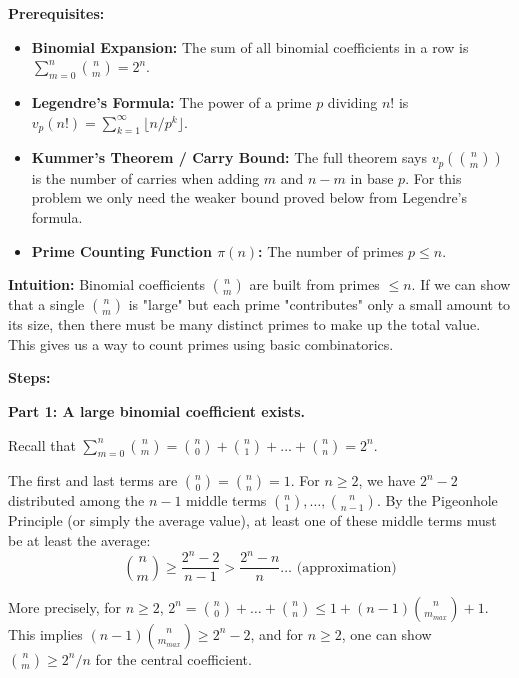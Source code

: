 \begin{solution}
\textbf{Prerequisites:}
\begin{itemize}
    \item \textbf{Binomial Expansion:} The sum of all binomial coefficients in a row is $\sum_{m=0}^n \binom{n}{m} = 2^n$.
    \item \textbf{Legendre's Formula:} The power of a prime $p$ dividing $n!$ is $v_p(n!) = \sum_{k=1}^\infty \lfloor n/p^k \rfloor$.
    \item \textbf{Kummer's Theorem / Carry Bound:} The full theorem says $v_p(\binom{n}{m})$ is the number of carries when adding $m$ and $n-m$ in base $p$. For this problem we only need the weaker bound proved below from Legendre's formula.
    \item \textbf{Prime Counting Function $\pi(n)$:} The number of primes $p \leq n$.
\end{itemize}

\bigskip

\textbf{Intuition:}
Binomial coefficients $\binom{n}{m}$ are built from primes $\leq n$. If we can show that a single $\binom{n}{m}$ is "large" but each prime "contributes" only a small amount to its size, then there must be many distinct primes to make up the total value. This gives us a way to count primes using basic combinatorics.

\bigskip

\textbf{Steps:}

\textbf{Part 1: A large binomial coefficient exists.}

Recall that $\sum_{m=0}^n \binom{n}{m} = \binom{n}{0} + \binom{n}{1} + \dots + \binom{n}{n} = 2^n$.

\bigskip

The first and last terms are $\binom{n}{0} = \binom{n}{n} = 1$. For $n \geq 2$, we have $2^n - 2$ distributed among the $n-1$ middle terms $\binom{n}{1}, \dots, \binom{n}{n-1}$. By the Pigeonhole Principle (or simply the average value), at least one of these middle terms must be at least the average:
\[ \binom{n}{m} \geq \frac{2^n - 2}{n-1} > \frac{2^n - n}{n} \dots \text{ (approximation)} \]

\bigskip

More precisely, for $n \geq 2$, $2^n = \binom{n}{0} + \dots + \binom{n}{n} \leq 1 + (n-1)\binom{n}{m_{max}} + 1$. This implies $(n-1)\binom{n}{m_{max}} \geq 2^n - 2$, and for $n \geq 2$, one can show $\binom{n}{m} \geq 2^n/n$ for the central coefficient.

\bigskip


\end{solution}
